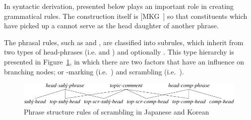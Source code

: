 
In syntactic derivation,  presented below plays an
important role in creating grammatical rules. The
construction itself is \mbox{[MKG ]} so that constituents
which have picked up a  cannot serve as the head daughter
of another  phrase.




\noindent The phrasal rules, such as  and
, are classified into subrules, which inherit from
two types of head-phrases (i.e.  and
) and optionally . This type
hierarchy is presented in Figure~\ref{fig:top:scr}, in which there are
two factors that have an influence on branching nodes; \wa or
\nun-marking (i.e.\ ) and scrambling (i.e.\ ).


\begin{figure}[!t]
\begin{center} 
\includegraphics[width=.9\textwidth]{pdf/top-scr.pdf}
\caption{Phrase structure rules of scrambling in Japanese and Korean}
\label{fig:top:scr}
\end{center}
\end{figure}


